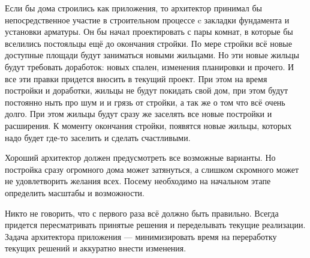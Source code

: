 Если бы дома строились как приложения, то архитектор принимал бы непосредственное участие в строительном процессе c закладки фундамента и установки арматуры.  Он бы начал проектировать с пары комнат, в которые бы вселились постояльцы ещё до окончания стройки. По мере стройки всё новые доступные площади будут заниматься новыми жильцами. Но эти новые жильцы будут требовать доработок: новых спален, изменения планировки и прочего. И все эти правки придется вносить в текущий проект. При этом на время постройки и доработки, жильцы не будут покидать свой дом, при этом будут постоянно ныть про шум и и грязь от стройки, а так же о том что всё очень долго. При этом жильцы будут сразу же заселять все новые постройки и расширения. К моменту окончания стройки, появятся новые жильцы, которых надо будет где-то заселить и сделать счастливыми.

Хороший архитектор должен предусмотреть все возможные варианты. Но постройка сразу огромного дома может затянуться, а слишком скромного может не удовлетворить желания всех. Посему необходимо на начальном этапе определить масштабы и возможности.

Никто не говорить, что с первого раза всё должно быть правильно. Всегда придется пересматривать принятые решения и переделывать текущие реализации. Задача архитектора приложения --- минимизировать время на переработку текущих решений и аккуратно внести изменения.






\clearpage